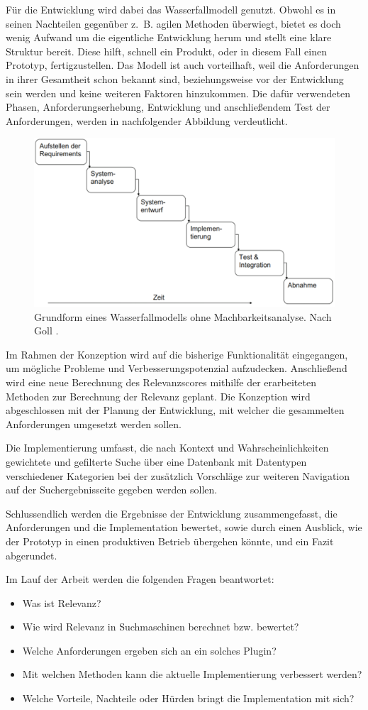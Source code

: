 Für die Entwicklung wird dabei das Wasserfallmodell genutzt.
Obwohl es in seinen Nachteilen gegenüber z. B. agilen Methoden überwiegt, bietet es doch wenig Aufwand um die eigentliche Entwicklung herum und stellt eine klare Struktur bereit.
Diese hilft, schnell ein Produkt, oder in diesem Fall einen Prototyp, fertigzustellen.
Das Modell ist auch vorteilhaft, weil die Anforderungen in ihrer Gesamtheit schon bekannt sind, beziehungsweise vor der Entwicklung sein werden und keine weiteren Faktoren hinzukommen. Die dafür verwendeten Phasen, Anforderungserhebung, Entwicklung und anschließendem Test der Anforderungen, werden in nachfolgender Abbildung verdeutlicht.
\begin{figure}[h]
  \begin{centering}
    \includegraphics[width=.6\textwidth]{figures/intro/waterfall.png}
    \caption{Grundform eines Wasserfallmodells ohne Machbarkeitsanalyse. Nach Goll \cite{goll2011}.}
    \label{fig:waterfall}
  \end{centering}
\end{figure}

Im Rahmen der Konzeption wird auf die bisherige Funktionalität eingegangen, um mögliche Probleme und Verbesserungspotenzial aufzudecken. Anschließend wird eine neue Berechnung des Relevanzscores mithilfe der erarbeiteten Methoden zur Berechnung der Relevanz geplant. Die Konzeption wird abgeschlossen mit der Planung der Entwicklung, mit welcher die gesammelten Anforderungen umgesetzt werden sollen.

Die Implementierung umfasst, die nach Kontext und Wahrscheinlichkeiten gewichtete und gefilterte Suche über eine Datenbank mit Datentypen verschiedener Kategorien bei der zusätzlich Vorschläge zur weiteren Navigation auf der Suchergebnisseite gegeben werden sollen.

Schlussendlich werden die Ergebnisse der Entwicklung zusammengefasst, die Anforderungen und die Implementation bewertet, sowie durch einen Ausblick, wie der Prototyp in einen produktiven Betrieb übergehen könnte, und ein Fazit abgerundet.

Im Lauf der Arbeit werden die folgenden Fragen beantwortet:
\begin{itemize}
  \item Was ist Relevanz?
  \item Wie wird Relevanz in Suchmaschinen berechnet bzw. bewertet?
  \item Welche Anforderungen ergeben sich an ein solches Plugin?
  \item Mit welchen Methoden kann die aktuelle Implementierung verbessert werden?
  \item Welche Vorteile, Nachteile oder Hürden bringt die Implementation mit sich?
\end{itemize}
